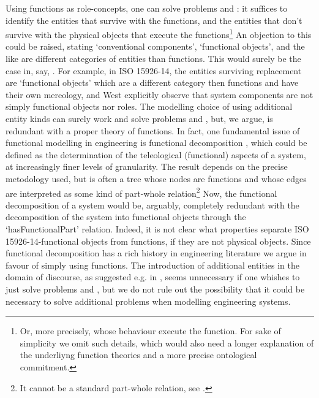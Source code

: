 \documentclass[
]{ceurart}
\begin{document}
Using functions as role-concepts, one can solve problems  and : it suffices to identify the entities that survive  with the functions, and the entities that don't survive with the physical objects that execute the functions\footnote{Or, more precisely, whose behaviour execute the function. For sake of simplicity we omit such details, which would also need a longer explanation of the underliyng function theories and a more precise ontological commitment.} 
An objection to this could be raised, stating `conventional components', `functional objects', and the like are different categories of entities than functions. This would surely be the case in, say, \cite{westDevelopingHighQuality2011,guarinoArtefactualSystemsMissing2014,kluwerISO159261420202020}. For example, in ISO 15926-14, the entities surviving replacement are `functional objects' which are a different category then functions and have their own mereology, and West \cite{westDevelopingHighQuality2011} explicitly observe that system components are not simply functional objects nor roles. The modelling choice of using additional entity kinds can surely work and solve problems   and , but, we argue, is redundant with a proper theory of functions. 
In fact, one fundamental issue of functional modelling in engineering is functional decomposition , which could be defined as the determination of the teleological (functional) aspects of a system, at increasingly finer levels of granularity. The result depends on the precise metodology used, but is often a tree whose nodes are functions and whose edges are interpreted as some kind of part-whole relation\footnote{It cannot be a standard part-whole relation, see \cite{vermaasFormalImpossibilityAnalysing2013}.}
Now, the functional decomposition of a system would be, arguably, completely redundant with the decomposition of the system into functional objects through the `hasFunctionalPart' relation. Indeed, it is not clear what properties separate ISO 15926-14-functional objects from functions, if they are not physical objects. Since functional decomposition has a rich history in engineering literature we argue in favour of simply using functions.
The introduction of additional entities in the domain of discourse, as suggested e.g. in \cite{westDevelopingHighQuality2011,guarinoArtefactualSystemsMissing2014}, seems unnecessary if one whishes to just solve problems  and , but we do not rule out the possibility that it could be necessary to solve additional problems when modelling engineering systems.
\end{document}
